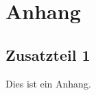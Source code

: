 \newpage
\appendix
\section{Anhang}

\subsection*{Zusatzteil 1} \label{anhang:zusatz1}

Dies ist ein Anhang.

\clearpage